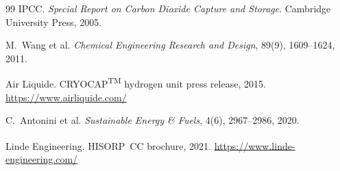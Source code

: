 \documentclass[12pt, a4paper]{report}
\begin{document}
\begin{thebibliography}{99}
IPCC. \textit{Special Report on Carbon Dioxide Capture and Storage}. Cambridge University Press, 2005.

M.~Wang et al. \textit{Chemical Engineering Research and Design}, 89(9), 1609--1624, 2011.

Air Liquide. CRYOCAP\textsuperscript{TM} hydrogen unit press release, 2015. \url{https://www.airliquide.com/}

C.~Antonini et al. \textit{Sustainable Energy \& Fuels}, 4(6), 2967--2986, 2020.

Linde Engineering. HISORP\textsuperscript{\textregistered}~CC brochure, 2021. \url{https://www.linde-engineering.com/}

\end{thebibliography}
\end{document}
